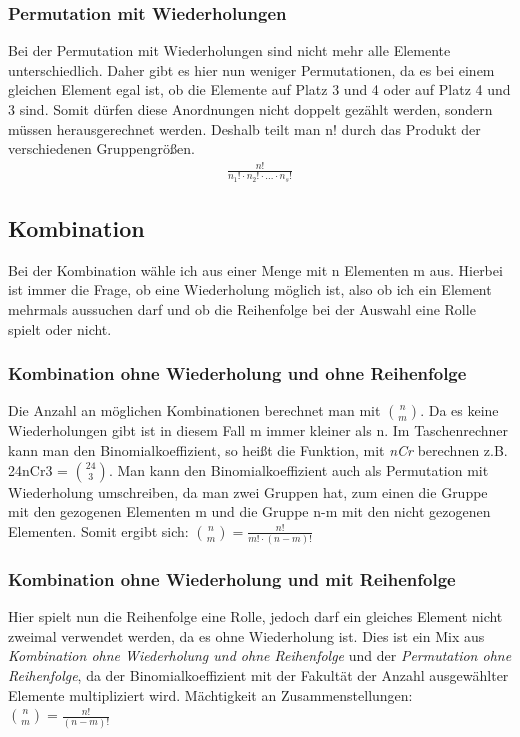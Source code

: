 \documentclass[a4paper]{article}
\begin{document}
\subsubsection{Permutation mit Wiederholungen}
Bei der Permutation mit Wiederholungen sind nicht mehr alle Elemente unterschiedlich. Daher gibt es hier nun weniger Permutationen, da es bei einem gleichen Element egal ist, ob die Elemente auf Platz 3 und 4 oder auf Platz 4 und 3 sind. Somit dürfen diese Anordnungen nicht doppelt gezählt werden, sondern müssen herausgerechnet werden.
Deshalb teilt man n! durch das Produkt der verschiedenen Gruppengrößen.
\begin{align*}
    \frac{n!}{n_1!\cdot n_2!\cdot...\cdot n_s!}
\end{align*}

\subsection{Kombination}
Bei der Kombination wähle ich aus einer Menge mit n Elementen m aus. Hierbei ist immer die Frage, ob eine Wiederholung möglich ist, also ob ich ein Element mehrmals aussuchen darf und ob die Reihenfolge bei der Auswahl eine Rolle spielt oder nicht. 

\subsubsection{Kombination ohne Wiederholung und ohne Reihenfolge}
Die Anzahl an möglichen Kombinationen berechnet man mit $\binom{n}{m}$. Da es keine Wiederholungen gibt ist in diesem Fall m immer kleiner als n. Im Taschenrechner kann man den Binomialkoeffizient, so heißt die Funktion, mit \textit{nCr} berechnen z.B. 24nCr3 = $\binom{24}{3}$.
Man kann den Binomialkoeffizient auch als Permutation mit Wiederholung umschreiben, da man zwei Gruppen hat, zum einen die Gruppe mit den gezogenen Elementen m und die Gruppe n-m  mit den nicht gezogenen Elementen. Somit ergibt sich: $\binom{n}{m}=\frac{n!}{m!\cdot(n-m)!}$

\subsubsection{Kombination ohne Wiederholung und mit Reihenfolge}
Hier spielt nun die Reihenfolge eine Rolle, jedoch darf ein gleiches Element nicht zweimal verwendet werden, da es ohne Wiederholung ist. Dies ist ein Mix aus \textit{Kombination ohne Wiederholung und ohne Reihenfolge} und der \textit{Permutation ohne Reihenfolge}, da der Binomialkoeffizient  mit der Fakultät der  Anzahl ausgewählter Elemente multipliziert wird.
Mächtigkeit an Zusammenstellungen: $\binom{n}{m}=\frac{n!}{(n-m)!}$
\end{document}
